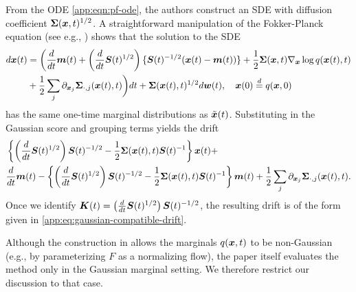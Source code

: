 From the ODE \eqref{app:eqn:pf-ode}, the authors construct an SDE with diffusion coefficient $\boldsymbol{\Sigma}(\boldsymbol{x}, t)^{1/2}$. A straightforward manipulation of the Fokker-Planck equation (see e.g., \citet[][Appendix D.1]{songscore2021}) shows that the solution to the SDE
\begin{equation*}
\begin{aligned}
    d \boldsymbol{x}(t) &= \bigg( \frac{d}{dt}\boldsymbol{m}(t) + \left(\frac{d}{dt}\boldsymbol{S}(t)^{1/2}\right)\{\boldsymbol{S}(t)^{-1/2}(\boldsymbol{x}(t) - \boldsymbol{m}(t))\} + \frac{1}{2} \boldsymbol{\Sigma}(\boldsymbol{x}, t) \nabla_{\boldsymbol{x}} \log q(\boldsymbol{x}(t), t)\\
    &+ \frac{1}{2} \sum_{j} \partial_{\boldsymbol{x}_j} \boldsymbol{\Sigma}_{\cdot, j}(\boldsymbol{x}(t), t) \bigg)dt + \boldsymbol{\Sigma}(\boldsymbol{x}(t), t)^{1/2} d\boldsymbol{w}(t), \quad \boldsymbol{x}(0) \overset{d}{=} q(\boldsymbol{x}, 0)
\end{aligned}
\end{equation*}
has the same one-time marginal distributions as $\tilde{\boldsymbol{x}}(t)$. Substituting in the Gaussian score and grouping terms yields the drift
\begin{equation*}
\begin{aligned}
   &\left\{ \left(\frac{d}{dt}\boldsymbol{S}(t)^{1/2}\right)\boldsymbol{S}(t)^{-1/2} - \frac{1}{2}\boldsymbol{\Sigma}(\boldsymbol{x}(t), t)\boldsymbol{S}(t)^{-1}\right\}\boldsymbol{x}(t) +\\
    &\frac{d}{dt}\boldsymbol{m}(t) - \left\{ \left(\frac{d}{dt}\boldsymbol{S}(t)^{1/2}\right)\boldsymbol{S}(t)^{-1/2} - \frac{1}{2}\boldsymbol{\Sigma}(\boldsymbol{x}(t), t)\boldsymbol{S}(t)^{-1}\right\} \boldsymbol{m}(t) + \frac{1}{2} \sum_{j} \partial_{\boldsymbol{x}_j} \boldsymbol{\Sigma}_{\cdot, j}(\boldsymbol{x}(t), t).
\end{aligned}
\end{equation*}
Once we identify $\boldsymbol{K}(t) = \left(\frac{d}{dt}\boldsymbol{S}(t)^{1/2}\right)\boldsymbol{S}(t)^{-1/2}$, the resulting drift is of the form given in \cref{app:eq:gaussian-compatible-drift}.

Although the construction in \citet{bartosh2025sde} allows the marginals $q(\boldsymbol{x}, t)$ to be non-Gaussian (e.g., by parameterizing $F$ as a normalizing flow), the paper itself evaluates the method only in the Gaussian marginal setting. We therefore restrict our discussion to that case.


